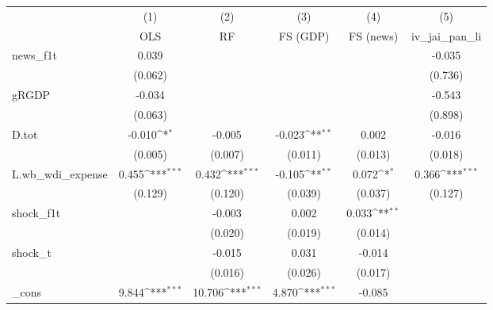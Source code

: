 {
\def\sym#1{\ifmmode^{#1}\else\(^{#1}\)\fi}
\begin{tabular}{l*{5}{c}}
\toprule
            &\multicolumn{1}{c}{(1)}&\multicolumn{1}{c}{(2)}&\multicolumn{1}{c}{(3)}&\multicolumn{1}{c}{(4)}&\multicolumn{1}{c}{(5)}\\
            &\multicolumn{1}{c}{OLS}&\multicolumn{1}{c}{RF}&\multicolumn{1}{c}{FS (GDP)}&\multicolumn{1}{c}{FS (news)}&\multicolumn{1}{c}{iv\_jai\_pan\_li}\\
\midrule
news\_f1t    &       0.039         &                     &                     &                     &      -0.035         \\
            &     (0.062)         &                     &                     &                     &     (0.736)         \\
\addlinespace
gRGDP       &      -0.034         &                     &                     &                     &      -0.543         \\
            &     (0.063)         &                     &                     &                     &     (0.898)         \\
\addlinespace
D.tot       &      -0.010\sym{*}  &      -0.005         &      -0.023\sym{**} &       0.002         &      -0.016         \\
            &     (0.005)         &     (0.007)         &     (0.011)         &     (0.013)         &     (0.018)         \\
\addlinespace
L.wb\_wdi\_expense&       0.455\sym{***}&       0.432\sym{***}&      -0.105\sym{**} &       0.072\sym{*}  &       0.366\sym{***}\\
            &     (0.129)         &     (0.120)         &     (0.039)         &     (0.037)         &     (0.127)         \\
\addlinespace
shock\_f1t   &                     &      -0.003         &       0.002         &       0.033\sym{**} &                     \\
            &                     &     (0.020)         &     (0.019)         &     (0.014)         &                     \\
\addlinespace
shock\_t     &                     &      -0.015         &       0.031         &      -0.014         &                     \\
            &                     &     (0.016)         &     (0.026)         &     (0.017)         &                     \\
\addlinespace
\_cons      &       9.844\sym{***}&      10.706\sym{***}&       4.870\sym{***}&      -0.085         &                     \\

\end{tabular}}

